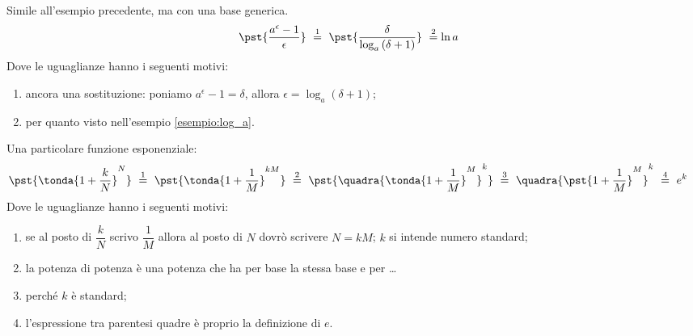 \begin{esempio}
Simile all'esempio precedente, ma con una base generica.
\begin{align*}
&\pst{\dfrac{a^\epsilon-1}{\epsilon}}
~ \stackrel{1}{=} ~  
\pst{\dfrac{\delta}{\log_a{(\delta+1)}}}~ \stackrel{2}{=}\ln{a}
\end{align*}
Dove le uguaglianze hanno i seguenti motivi:
\begin{enumerate} [nosep]
 \item ancora una sostituzione: poniamo
\(a^\epsilon-1=\delta\), allora \(\epsilon=\log_a(\delta+1)\);
 \item per quanto visto nell'esempio \ref{esempio:log_a}.
\end{enumerate}
\end{esempio}

\begin{esempio}
Una particolare funzione esponenziale:
\begin{align*}
 &\pst{\tonda{1+\dfrac{k}{N}}^N}
~ \stackrel{1}{=} ~  
\pst{\tonda{1+\dfrac{1}{M}}^{kM}}
~ \stackrel{2}{=} ~
\pst{\quadra{\tonda{1+\dfrac{1}{M}}^M}^k}
~ \stackrel{3}{=} ~ {\quadra{\pst{1+\dfrac{1}{M}}^M}^k}
~ \stackrel{4}{=} ~ e^k
\end{align*}
Dove le uguaglianze hanno i seguenti motivi:
\begin{enumerate} [nosep]
 \item se al posto di \(\dfrac{k}{N}\) scrivo \(\dfrac{1}{M}\) 
allora al posto di \(N\) dovrò scrivere \(N=kM\); $k$ si intende numero 
standard;
 \item la potenza di potenza è una potenza che ha per base la stessa base 
e per \dots
 \item perché $k$ è standard;
 \item l'espressione tra parentesi quadre è proprio la definizione di \(e\).
\end{enumerate}
\end{esempio}

